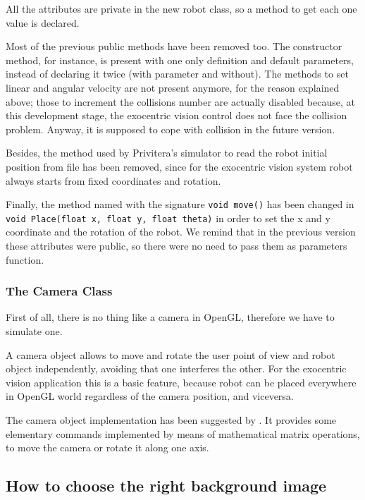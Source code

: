 %
All the attributes are private in the new robot class, 
so a method to get each one value is declared. 
%

%
Most of the previous public methods have been removed too. 
The constructor method, for instance, is present with one
only definition and default parameters, instead of declaring 
it twice (with parameter and without). The methods to set
linear and angular velocity are not present anymore, for 
the reason explained above; those to increment the collisions 
number are actually disabled because, at this development 
stage, the exocentric vision control does not face the collision 
problem. Anyway, it is supposed to cope with collision in 
the future version.
%

%
Besides, the method used by Privitera's simulator to read 
the robot initial position from file has been removed, since 
for the exocentric vision system robot always starts from 
fixed coordinates and rotation.
%

%
Finally, the method named with the signature 
\texttt{void move()} has been changed in \texttt{void Place(float x, float y, float theta)}
in order to set the x and y coordinate and the rotation of the robot. 
We remind that in the previous version these attributes
were public, so there were no need to pass them as parameters function.

\subsubsection{The Camera Class}
\label{sub:cameraclass}


First of all, there is no thing like a camera in OpenGL, therefore we have to
simulate one.
%

%
A camera object allows to move and rotate the user point of view and robot
object independently, avoiding that one interferes the other. For the exocentric
vision application this is a basic feature, because robot can be placed
everywhere in OpenGL world regardless of the camera position, and viceversa.
%

%
The camera object implementation has been suggested by \cite{opengl:camera}.
It provides some elementary commands implemented by means of mathematical matrix
operations, to move the camera or rotate it along one axis.

\subsection{How to choose the right background image}
\label{sub:howbackgroundimage}

